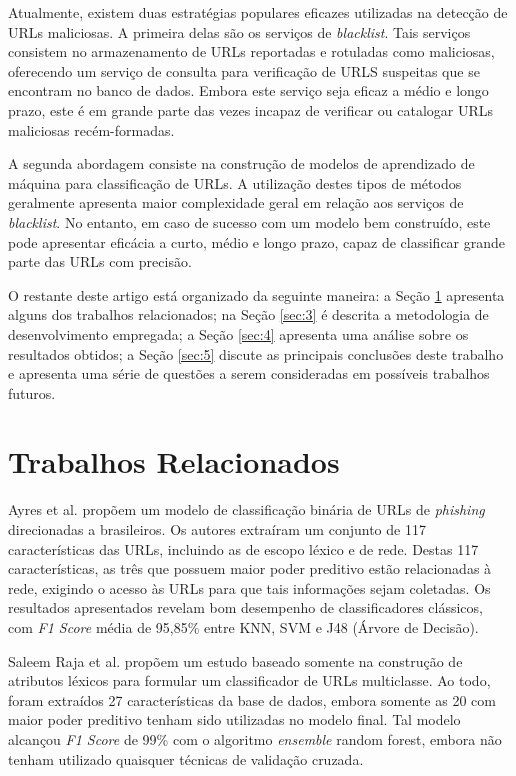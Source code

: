 \documentclass[manuscript,screen,review]{acmart}
\begin{document}

Atualmente, existem duas estratégias populares eficazes utilizadas na detecção de URLs maliciosas. A primeira delas são os serviços de \emph{blacklist}. Tais serviços consistem no armazenamento de URLs reportadas e rotuladas como maliciosas, oferecendo um serviço de consulta para verificação de URLS suspeitas que se encontram no banco de dados. Embora este serviço seja eficaz a médio e longo prazo, este é em grande parte das vezes incapaz de verificar ou catalogar URLs maliciosas recém-formadas.

A segunda abordagem consiste na construção de modelos de aprendizado de máquina para classificação de URLs. A utilização destes tipos de métodos geralmente apresenta maior complexidade geral em relação aos serviços de \emph{blacklist}. No entanto, em caso de sucesso com um modelo bem construído, este pode apresentar eficácia a curto, médio e longo prazo, capaz de classificar grande parte das URLs com precisão.

O restante deste artigo está organizado da seguinte maneira: a Seção \ref{sec:2} apresenta alguns dos trabalhos relacionados; na Seção \ref{sec:3} é descrita a metodologia de desenvolvimento empregada; a Seção \ref{sec:4} apresenta uma análise sobre os resultados obtidos; a Seção \ref{sec:5} discute as principais conclusões deste trabalho e apresenta uma série de questões a serem consideradas em possíveis trabalhos futuros.

\section{Trabalhos Relacionados} \label{sec:2}

Ayres et al. \cite{sbrc} propõem um modelo de classificação binária de URLs de \emph{phishing} direcionadas a brasileiros. Os autores extraíram um conjunto de 117 características das URLs, incluindo as de escopo léxico e de rede. Destas 117 características, as três que possuem maior poder preditivo estão relacionadas à rede, exigindo o acesso às URLs para que tais informações sejam coletadas. Os resultados apresentados revelam bom desempenho de classificadores clássicos, com \emph{F1 Score} média de 95,85\% entre KNN, SVM e J48 (Árvore de Decisão).

Saleem Raja et al. \cite{SALEEMRAJA2021163} propõem um estudo baseado somente na construção de atributos léxicos para formular um classificador de URLs multiclasse. Ao todo, foram extraídos 27 características da base de dados, embora somente as 20 com maior poder preditivo tenham sido utilizadas no modelo final. Tal modelo alcançou \emph{F1 Score} de 99\% com o algoritmo \emph{ensemble} random forest, embora não tenham utilizado quaisquer técnicas de validação cruzada.
\end{document}
